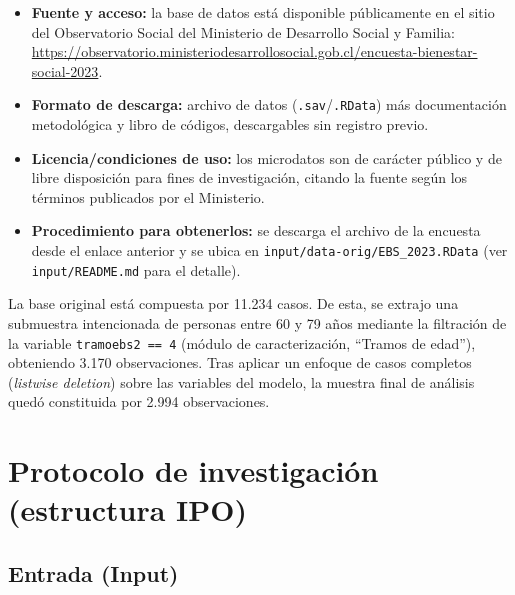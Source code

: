\documentclass[
  spanish,
  a4paper,
  oneside]{scrbook}
\providecommand{\tightlist}{%
  \setlength{\itemsep}{0pt}\setlength{\parskip}{0pt}}
\begin{document}
\begin{itemize}
\tightlist
\item
  \textbf{Fuente y acceso:} la base de datos está disponible
  públicamente en el sitio del Observatorio Social del Ministerio de
  Desarrollo Social y Familia:
  \url{https://observatorio.ministeriodesarrollosocial.gob.cl/encuesta-bienestar-social-2023}.
\item
  \textbf{Formato de descarga:} archivo de datos
  (\texttt{.sav}/\texttt{.RData}) más documentación metodológica y libro
  de códigos, descargables sin registro previo.
\item
  \textbf{Licencia/condiciones de uso:} los microdatos son de carácter
  público y de libre disposición para fines de investigación, citando la
  fuente según los términos publicados por el Ministerio.
\item
  \textbf{Procedimiento para obtenerlos:} se descarga el archivo de la
  encuesta desde el enlace anterior y se ubica en
  \texttt{input/data-orig/EBS\_2023.RData} (ver \texttt{input/README.md}
  para el detalle).
\end{itemize}

La base original está compuesta por 11.234 casos. De esta, se extrajo
una submuestra intencionada de personas entre 60 y 79 años mediante la
filtración de la variable \texttt{tramoebs2\ ==\ 4} (módulo de
caracterización, ``Tramos de edad''), obteniendo 3.170 observaciones.
Tras aplicar un enfoque de casos completos (\emph{listwise deletion})
sobre las variables del modelo, la muestra final de análisis quedó
constituida por 2.994 observaciones.

\section{Protocolo de investigación (estructura
IPO)}\label{protocolo-de-investigaciuxf3n-estructura-ipo}

\subsection{Entrada (Input)}\label{entrada-input}
\end{document}
